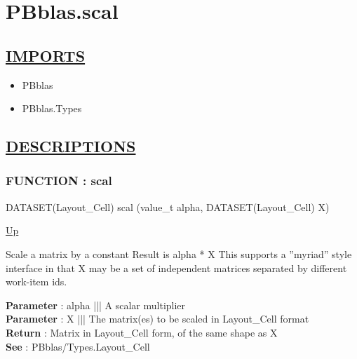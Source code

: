 \chapter*{PBblas.scal}
\hypertarget{ecldoc:toc:PBblas.scal}{}

\section*{\underline{IMPORTS}}
\begin{itemize}
\item PBblas
\item PBblas.Types
\end{itemize}

\section*{\underline{DESCRIPTIONS}}
\subsection*{FUNCTION : scal}
\hypertarget{ecldoc:pbblas.scal}{}
\begin{minipage}[t]{\textwidth}
\begin{flushleft}
DATASET(Layout\_Cell) scal (value\_t alpha, DATASET(Layout\_Cell) X)
\end{flushleft}
\end{minipage}
\hyperlink{ecldoc:toc:PBblas}{Up}

\par
Scale a matrix by a constant Result is alpha * X This supports a ''myriad'' style interface in that X may be a set of independent matrices separated by different work-item ids.
\par
\textbf{Parameter} : alpha ||| A scalar multiplier \\
\textbf{Parameter} : X ||| The matrix(es) to be scaled in Layout\_Cell format \\
\textbf{Return} : Matrix in Layout\_Cell form, of the same shape as X \\
\textbf{See} : PBblas/Types.Layout\_Cell \\
